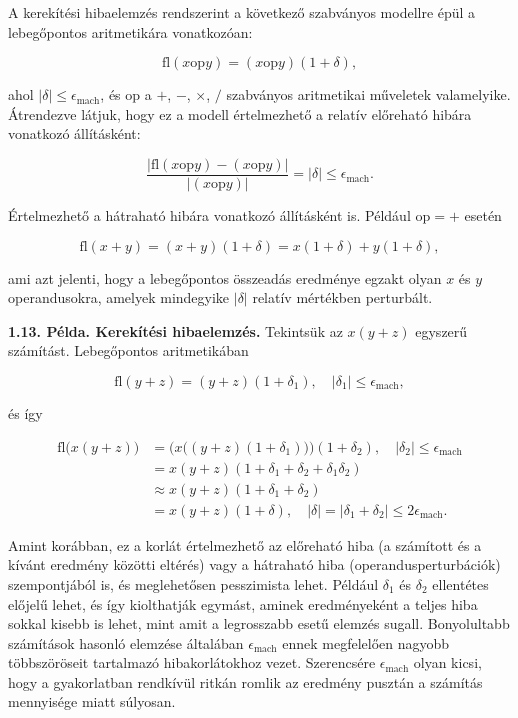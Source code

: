 \documentclass[
  magyar,
  11pt]{article}
\begin{document}
A kerekítési hibaelemzés rendszerint a következő szabványos modellre
épül a lebegőpontos aritmetikára vonatkozóan:

\[\mathrm{fl}(x \mathbin{\mathrm{op}} y) = (x \mathbin{\mathrm{op}} y)(1 + \delta),\]

ahol \(|\delta| \le \epsilon_{\text{mach}}\), és \(\mathrm{op}\) a
\(+\), \(-\), \(\times\), \(/\) szabványos aritmetikai műveletek
valamelyike. Átrendezve látjuk, hogy ez a modell értelmezhető a relatív
előreható hibára vonatkozó állításként:

\[\frac{|\mathrm{fl}(x \mathbin{\mathrm{op}} y) - (x \mathbin{\mathrm{op}} y)|}{|(x \mathbin{\mathrm{op}} y)|} = |\delta| \le \epsilon_{\text{mach}}.\]

Értelmezhető a hátraható hibára vonatkozó állításként is. Például
\(\mathrm{op} = +\) esetén

\[\mathrm{fl}(x + y) = (x + y)(1 + \delta) = x(1 + \delta) + y(1 + \delta),\]

ami azt jelenti, hogy a lebegőpontos összeadás eredménye egzakt olyan
\(x\) és \(y\) operandusokra, amelyek mindegyike \(|\delta|\) relatív
mértékben perturbált.

\textbf{1.13. Példa. Kerekítési hibaelemzés.} Tekintsük az \(x(y + z)\)
egyszerű számítást. Lebegőpontos aritmetikában

\[\mathrm{fl}(y + z) = (y + z)(1 + \delta_1), \quad |\delta_1| \le \epsilon_{\text{mach}},\]

és így

\[\begin{aligned}
\mathrm{fl}\bigl(x(y + z)\bigr) &= \bigl(x\bigl((y + z)(1 + \delta_1)\bigr)\bigr)(1 + \delta_2), \quad |\delta_2| \le \epsilon_{\text{mach}} \\
&= x(y + z)(1 + \delta_1 + \delta_2 + \delta_1\delta_2) \\
&\approx x(y + z)(1 + \delta_1 + \delta_2) \\
&= x(y + z)(1 + \delta), \quad |\delta| = |\delta_1 + \delta_2| \le 2\epsilon_{\text{mach}}.
\end{aligned}\]

Amint korábban, ez a korlát értelmezhető az előreható hiba (a számított
és a kívánt eredmény közötti eltérés) vagy a hátraható hiba
(operandusperturbációk) szempontjából is, és meglehetősen pesszimista
lehet. Például \(\delta_1\) és \(\delta_2\) ellentétes előjelű lehet, és
így kiolthatják egymást, aminek eredményeként a teljes hiba sokkal
kisebb is lehet, mint amit a legrosszabb esetű elemzés sugall.
Bonyolultabb számítások hasonló elemzése általában
\(\epsilon_{\text{mach}}\) ennek megfelelően nagyobb többszöröseit
tartalmazó hibakorlátokhoz vezet. Szerencsére \(\epsilon_{\text{mach}}\)
olyan kicsi, hogy a gyakorlatban rendkívül ritkán romlik az eredmény
pusztán a számítás mennyisége miatt súlyosan.
\end{document}
